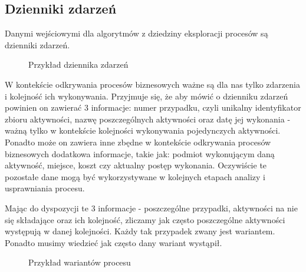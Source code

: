 \subsection{Dzienniki zdarzeń}

Danymi wejściowymi dla algorytmów z dziedziny eksploracji procesów są dzienniki zdarzeń.
 
\begin{figure}[h]
	\caption{\label{fig:event_log_example}Przykład dziennika zdarzeń}
\end{figure}

W kontekście odkrywania procesów biznesowych ważne są dla nas tylko zdarzenia i kolejność ich wykonywania.
Przyjmuje się, że aby mówić o dzienniku zdarzeń powinien on zawierać 3 informacje: numer przypadku, czyli unikalny identyfikator zbioru aktywności, nazwę poszczególnych aktywności oraz datę jej wykonania - ważną tylko w kontekście kolejności wykonywania pojedynczych aktywności. Ponadto może on zawiera inne zbędne w kontekście odkrywania procesów biznesowych dodatkowa informacje, takie jak: podmiot wykonującym daną aktywność, miejsce, koszt czy aktualny postęp wykonania. Oczywiście te pozostałe dane mogą być wykorzystywane w kolejnych etapach analizy i usprawniania procesu.

Mając do dyspozycji te 3 informacje - poszczególne przypadki, aktywności na nie się składające oraz ich kolejność, zliczamy jak często poszczególne aktywności występują w danej kolejności. Każdy tak przypadek zwany jest wariantem. Ponadto musimy wiedzieć jak często dany wariant wystąpił.

\begin{figure}[h]
	\caption{\label{fig:process_variants_example}Przykład wariantów procesu}
\end{figure}

